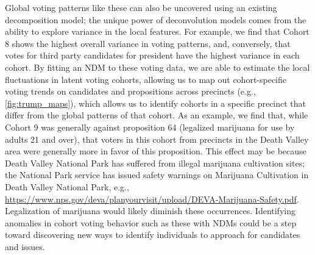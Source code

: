 \documentclass[twoside,11pt]{article}
\begin{document}
Global voting patterns like these can also be uncovered using an existing decomposition model; the unique power of deconvolution models comes from the ability to explore variance in the local features.  For example, we find that Cohort 8 shows the highest overall variance in voting patterns, and, conversely, that votes for third party candidates for president have the highest variance in each cohort.  By fitting an NDM to these voting data, we are able to estimate the local fluctuations in latent voting cohorts, allowing us to map out cohort-specific voting trends on candidates and propositions across precincts (e.g., \cref{fig:trump_maps}), which allows us to identify cohorts in a specific precinct that differ from the global patterns of that cohort.  As an example, we find that, while Cohort 9 was generally against proposition 64 (legalized marijuana for use by adults 21 and over), that voters in this cohort from precincts in the Death Valley area were generally more in favor of this proposition.  This effect may be because Death Valley National Park has suffered from illegal marijuana cultivation sites; the National Park service has issued safety warnings on Marijuana Cultivation in
Death Valley National Park, e.g., \url{https://www.nps.gov/deva/planyourvisit/upload/DEVA-Marijuana-Safety.pdf}. Legalization of marijuana would likely diminish these occurrences.  Identifying anomalies in cohort voting behavior such as these with NDMs could be a step toward discovering new ways to identify individuals to approach for candidates and issues.
\end{document}
